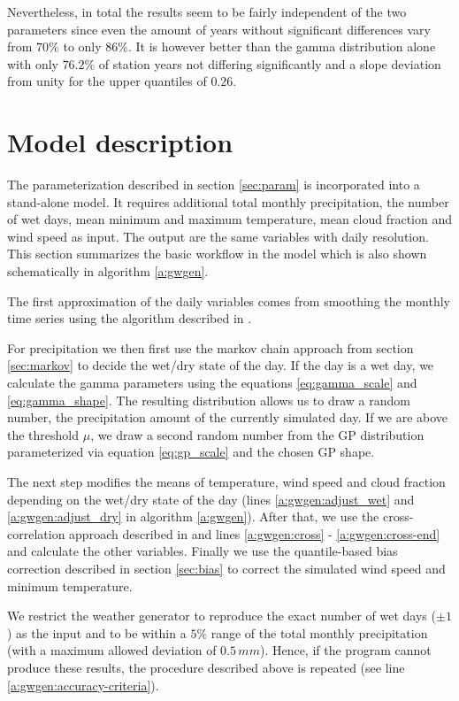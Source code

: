 \begin{refsection}
Nevertheless, in total the results seem to be fairly independent of the two parameters since even the amount of years without significant differences vary from $70\%$ to only $86\%$. It is however better than the gamma distribution alone with only $76.2\%$ of station years not differing significantly and a slope deviation from unity for the upper quantiles of $0.26$.


\section{Model description} \label{sec:model}
The parameterization described in section \ref{sec:param} is incorporated into a stand-alone model. It requires additional total monthly precipitation, the number of wet days, mean minimum and maximum temperature, mean cloud fraction and wind speed as input. The output are the same variables with daily resolution. This section summarizes the basic workflow in the model which is also shown schematically in algorithm \ref{a:gwgen}.

The first approximation of the daily variables comes from smoothing the monthly time series using the algorithm described in \cite{RymesMyers2001}.

For precipitation we then first use the markov chain approach from section \ref{sec:markov} to decide the wet/dry state of the day. If the day is a wet day, we calculate the gamma parameters using the equations \eqref{eq:gamma_scale} and \eqref{eq:gamma_shape}. The resulting distribution allows us to draw a random number, the precipitation amount of the currently simulated day. If we are above the threshold $\mu$, we draw a second random number from the GP distribution parameterized via equation \eqref{eq:gp_scale} and the chosen GP shape.

The next step modifies the means of temperature, wind speed and cloud fraction depending on the wet/dry state of the day (lines \ref{a:gwgen:adjust_wet} and \ref{a:gwgen:adjust_dry} in algorithm \ref{a:gwgen}). After that, we use the cross-correlation approach described in \cite{Richardson1981} and lines \ref{a:gwgen:cross} - \ref{a:gwgen:cross-end} and calculate the other variables. Finally we use the quantile-based bias correction described in section \ref{sec:bias} to correct the simulated wind speed and minimum temperature.

We restrict the weather generator to reproduce the exact number of wet days ($\pm1$) as the input and to be within a $5\%$ range of the total monthly precipitation (with a maximum allowed deviation of $0.5\,\unit{mm}$). Hence, if the program cannot produce these results, the procedure described above is repeated (see line \ref{a:gwgen:accuracy-criteria}).


\end{refsection}
